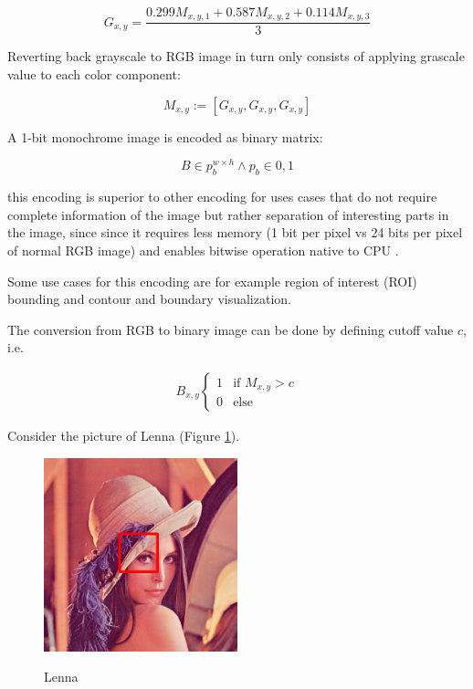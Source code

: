 \documentclass[pdftex,12pt,a4paper]{report}
\begin{document}
$$
G_{x, y} = \frac{0.299 M_{x, y, 1} + 0.587  M_{x, y, 2} + 0.114 M_{x, y, 3}}{3}
$$

Reverting back grayscale to RGB image in turn only consists of applying grascale value to each color component:

$$
M_{x, y} := [G_{x, y}, G_{x, y}, G_{x, y}]
$$

A 1-bit monochrome image is encoded as binary matrix:

$$
B \in p_b^{w \times h} \land p_b \in {0, 1}
$$

this encoding is superior to other encoding for uses cases that do not require complete information of the image but rather separation of interesting parts in the image, since since it requires less memory (1 bit per pixel vs 24 bits per pixel of normal RGB image) and enables bitwise operation native to CPU \cite{kernighan1988c}. 

Some use cases for this encoding are for example region of interest (ROI) bounding and contour and boundary visualization.

The conversion from RGB to binary image can be done by defining cutoff value $c$, i.e.

\begin{gather*}
B_{x, y}
\begin{cases}
  1 & \text{if } M_{x, y} > c\\    
  0 & \text{else}  
\end{cases}
\end{gather*}

Consider the picture of Lenna (Figure \ref{fig:lennasample}).

\begin{figure}[H]
\centering
\includegraphics[width=0.5\textwidth]{images/lenna_marked}
\label{fig:lennasample}
\caption{Lenna}
\end{figure}
\end{document}
